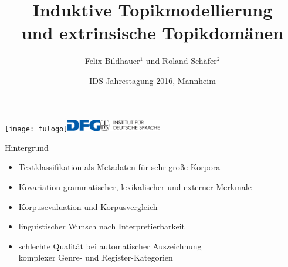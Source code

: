 \documentclass{beamer}
\title[Topikmodellierung und -domänen]{Induktive Topikmodellierung\\und extrinsische Topikdomänen}
\author[Felix Bildhauer, Roland Schäfer]{Felix Bildhauer$^1$ und Roland Schäfer$^2$}
\institute[]{$^1$Abt.\ Grammatik IDS Mannheim, $^2$Ling.\ Webcharakterisierung (DFG) FU Berlin}
\date[]{IDS Jahrestagung 2016, Mannheim}
\begin{document}

\begin{frame}
\texttt{[image: fulogo]}\hspace{0.05\textwidth}\includegraphics[width=0.11\textwidth]{dfglogo}\hspace{0.4
\textwidth}\includegraphics[width=0.2\textwidth]{idslogo}
  \maketitle
\end{frame}



\begin{frame}
  {Hintergrund}
  \begin{itemize}
    \item \alert{Textklassifikation} als \alert{Metadaten} für sehr große Korpora
    \item \alert{Kovariation} grammatischer, lexikalischer und externer Merkmale
    \item \alert{Korpusevaluation} und Korpusvergleich\\
      \citep{Kilgarriff2001,BiemannEa2013,SchaeferBildhauer2013de}
    \item linguistischer Wunsch nach \alert{Interpretierbarkeit}
    \item schlechte Qualität bei automatischer Auszeichnung\\
      komplexer Genre- und Register-Kategorien \citep{BiberEgbert2016}
  \end{itemize}
\end{frame}
\end{document}
